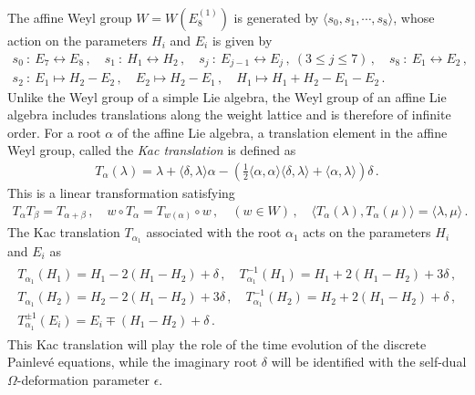 \documentclass[11pt, a4paper]{article}
\theoremstyle{definition}
\begin{document}
The affine Weyl group $ W = W(E_8^{(1)}) $ is generated by $ \langle s_0, s_1, \cdots, s_8 \rangle $, whose action on the parameters $ H_i $ and $ E_i $ is given by
\begin{gather}\label{eq:E8Weyl}
    s_0 \ : \ E_7 \leftrightarrow E_8 \, , \quad
    s_1 \ : \ H_1 \leftrightarrow H_2 \, , \quad
    s_j \ : \ E_{j-1} \leftrightarrow E_j \, , \ (3 \leq j \leq 7) \, , \quad
    s_8 \ : \ E_1 \leftrightarrow E_2 \, , \nonumber \\
    s_2 \ : \ E_1 \mapsto H_2-E_2 \, , \quad E_2 \mapsto H_2-E_1 \, , \quad H_1 \mapsto H_1+H_2-E_1-E_2 \, .
\end{gather}
Unlike the Weyl group of a simple Lie algebra, the Weyl group of an affine Lie algebra includes translations along the weight lattice and is therefore of infinite order. For a root $ \alpha $ of the affine Lie algebra, a translation element in the affine Weyl group, called the \emph{Kac translation} is defined as
\begin{align}\label{eq:Kac-traslation}
    T_\alpha(\lambda) = \lambda + \langle \delta, \lambda \rangle \alpha - \left( \frac{1}{2} \langle \alpha, \alpha \rangle \langle \delta, \lambda \rangle + \langle \alpha, \lambda \rangle \right) \delta \, .
\end{align}
This is a linear transformation satisfying
\begin{align}
    T_\alpha T_\beta = T_{\alpha+\beta} \, , \quad
    w\circ T_\alpha = T_{w(\alpha)} \circ w \, , \quad (w \in W) \, , \quad
    \langle T_\alpha(\lambda), T_\alpha(\mu) \rangle = \langle \lambda, \mu \rangle \, .
\end{align}
The Kac translation $ T_{\alpha_1} $ associated with the root $ \alpha_1 $ acts on the parameters $ H_i $ and $ E_i $ as
\begin{gather}
    \begin{gathered}\label{eq:HE-Kac}
        T_{\alpha_1}(H_1) = H_1 - 2(H_1-H_2) + \delta \, , \quad
        T_{\alpha_1}^{-1}(H_1) = H_1 + 2(H_1-H_2) + 3\delta \, , \\
        T_{\alpha_1}(H_2) = H_2 - 2(H_1-H_2) + 3\delta \, , \quad
        T_{\alpha_1}^{-1}(H_2) = H_2 + 2(H_1-H_2) + \delta \, , \\
        T_{\alpha_1}^{\pm 1}(E_i) = E_i \mp (H_1-H_2) + \delta \, .
    \end{gathered}
\end{gather}
This Kac translation will play the role of the time evolution of the discrete Painlev\'e equations, while the imaginary root $ \delta $ will be identified with the self-dual $ \Omega $-deformation parameter $ \epsilon $.
\end{document}
